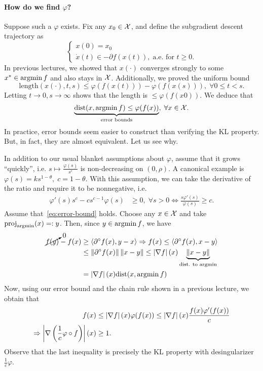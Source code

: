 \paragraph{How do we find $\varphi$?}
Suppose such a $\varphi$ exists. Fix any $x_0 \in \mathcal{X}$, and define the
subgradient descent trajectory as
\[
	\begin{cases}
		x(0) = x_0 \\
		\dot{x}(t) \in -\partial f(x(t)), \; \text{a.e. for } t \geq 0.
	\end{cases}
\]
In previous lectures, we showed that $x(\cdot)$ converges strongly to some $x^*
\in \operatorname*{argmin} f$ and also stays in $\mathcal{X}$. Additionally, we proved the uniform
bound
\begin{equation}
	\mathrm{length}(x(\cdot), t, s) \leq
	\varphi(f(x(t))) - \varphi(f(x(s))), \; \forall 0 \leq t < s.
	\label{eq:uniform-bound}
\end{equation}
Letting $t \to 0, s \to \infty$ shows that the length is $\leq \varphi(f(x0))$.
We deduce that
\begin{equation}
	\underbrace{\mathrm{dist}(x, \operatorname*{argmin} f) \leq \varphi(f(x))}_{\text{error
	bounds}}, \; \forall x \in \mathcal{X}.
	\label{eq:error-bound}
\end{equation}
In practice, error bounds seem easier to construct than verifying the KL
property. But, in fact, they are almost equivalent. Let us see why.

In addition to our usual blanket assumptions about $\varphi$, assume that it
grows ``quickly'', i.e. $s \mapsto \frac{\varphi(s)}{s^c}$ is non-decreasing on
$(0, \rho)$. A canonical example is $\varphi(s) = ks^{1 - \theta}, \; c = 1
-\theta$.
With this assumption, we can take the derivative of the ratio and require it to
be nonnegative, i.e.
\begin{align*}
	\varphi'(s) s^c - c s^{c-1} \varphi(s) &\geq 0, \; \forall s > 0
	\Leftrightarrow \frac{s \varphi'(s)}{\varphi(s)} \geq c.
\end{align*}
Assume that~\cref{eq:error-bound} holds. Choose any $x \in \mathcal{X}$ and take
$\mathrm{proj}_{\operatorname*{argmin}}(x) =: y$. Then, since $y \in \operatorname*{argmin} f$, we have
\begin{align*}
	\cancelto{0}{f(y)} - f(x) &\geq \left\langle \partial^{\circ} f(x), y - x \right\rangle \Rightarrow
	f(x) \leq \left\langle \partial^{\circ} f(x), x - y \right\rangle \\
	&\leq \left \| \partial^{\circ} f(x) \right \| \left \| x - y \right \| \leq
		\left| \nabla f \right|(x) \underbrace{\left \| x - y \right \|}_{\text{dist. to argmin}} \\
		&= \left| \nabla f \right|(x) \mathrm{dist}(x, \operatorname*{argmin} f)
\end{align*}
Now, using our error bound and the chain rule shown in a previous lecture, we
obtain that
\begin{align*}
	f(x) &\leq \left| \nabla f \right|(x) \varphi(f(x)) \leq
		\left| \nabla f \right|(x) \frac{f(x) \varphi'(f(x))}{c} \\
	\Rightarrow \left| \nabla\left(\frac{1}{c} \varphi \circ f\right) \right|(x) &\geq 1.
\end{align*}
Observe that the last inequality is precisely the KL property with
desingularizer $\frac{1}{c} \varphi$.

